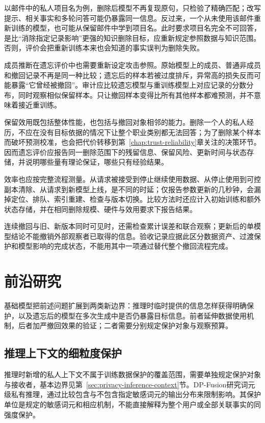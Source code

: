 以邮件中的私人项目名为例，删除后模型不再复现原句，只检验了精确匹配；改写提示、相关事实和多轮问答可能仍暴露同一信息。反过来，一个从未使用该邮件重新训练的模型，也可能从保留邮件中学到项目名。此时要求项目名完全不可回答，是比“消除指定记录影响”更强的知识删除目标，应重新规定参照数据与知识范围。否则，评价会把重新训练本来也会知道的事实误判为删除失败。

成员推断在遗忘评价中也需要重新设定攻击参照。原始模型上的成员、普通非成员和撤回记录不再是同一种比较；遗忘后的样本若被过度排斥，异常高的损失反而可能暴露“它曾经被撤回”。审计应比较遗忘模型与重训练模型上对应记录的分数分布，同时观察相似保留样本。只让撤回样本变得比所有其他样本都难预测，并不意味着接近重训练。

保留效用既包括整体性能，也包括与撤回对象相邻的能力。删除一个人的私人经历，不应在没有目标依据的情况下让整个职业类别都无法回答；为了删除某个样本而破坏预测校准，也会把代价转移到第~\ref{chap:trust-reliability}章关注的决策环节。因而遗忘评价应报告同一删除范围下的残留信息、保留风险、更新时间与状态存储，并说明哪些量有理论保证，哪些只有经验结果。

效率也应按完整流程测量。从请求被接受到停止继续使用数据、从停止使用到可控副本清除、从请求到新模型上线，是不同的时延；仅报告参数更新的几秒钟，会漏掉定位、排队、索引重建、检查与版本切换。比较方法时还应计入初始训练和额外状态存储，并在相同删除规模、硬件与效用要求下报告结果。

连续撤回与旧、新版本同时可见时，还需检查累计误差和联合观察；更新后的单模型结论不能撤销外部观察者已取得的信息。验收记录应据此区分数据资产、过渡保护和模型影响的完成状态，不能用其中一项通过替代整个撤回流程完成。

\section{前沿研究}
\label{sec:privacy-frontiers}

基础模型把前述问题扩展到两类新边界：推理时临时提供的信息怎样获得明确保护，以及遗忘后的模型在多次生成中是否仍暴露目标信息。前者延伸数据使用机制，后者加严撤回效果的验证；二者需要分别规定保护对象与观察预算。

\subsection{推理上下文的细粒度保护}

推理时新增的私人上下文不属于训练数据保护的覆盖范围，需要单独规定保护对象与接收者，基本边界见第~\ref{sec:privacy-inference-context}节。DP-Fusion研究词元级私有推理，通过比较包含与不包含指定敏感词元的输出分布来限制影响。其保护单位是规定的敏感词元和相应机制，不能直接解释为整个用户或全部关联事实的同强度保护。

